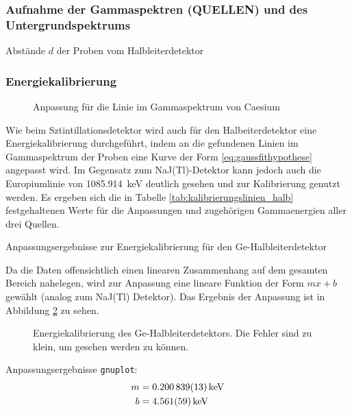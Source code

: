 \documentclass[11pt, a4paper]{article}
\numberwithin{equation}{section}
\begin{document}
\subsubsection{Aufnahme der Gammaspektren (QUELLEN) und des Untergrundspektrums}
\begin{table}[h]
	\centering
	
	\caption{Abstände $d$ der Proben vom Halbleiterdetektor}
	\label{tab:abstand_halbleiterdetektor}
\end{table}

\subsubsection{Energiekalibrierung}
\label{sec:kalibrierung_halb}
\begin{figure}[ht]
	\centering
	\resizebox{0.85\textwidth}{!}{
		
	}
	\caption{Anpassung für die Linie im Gammaspektrum von Caesium}
	\label{fig:fit_caesium}
\end{figure}

Wie beim Sztintillationsdetektor wird auch für den Halbeiterdetektor eine Energiekalibrierung durchgeführt, indem an die gefundenen Linien im Gammaspektrum der Proben eine Kurve der Form \eqref{eq:gaussfithypothese} angepasst wird.
Im Gegensatz zum NaJ(Tl)-Detektor kann jedoch auch die Europiumlinie von \SI{1085.914}{\kilo\electronvolt} deutlich gesehen und zur Kalibrierung genutzt werden.
Es ergeben sich die in Tabelle \ref{tab:kalibrierungslinien_halb} festgehaltenen Werte für die Anpassungen und zugehörigen Gammaenergien aller drei Quellen.
\begin{table}[ht]
	\centering
	
	\caption{Anpassungsergebnisse zur Energiekalibrierung für den Ge-Halbleiterdetektor}
	\label{tab:kalibrierungslinien_halb}
\end{table}
Da die Daten offensichtlich einen linearen Zusammenhang auf dem gesamten Bereich nahelegen, wird zur Anpassung eine lineare Funktion der Form $mx + b$ gewählt (analog zum NaJ(Tl) Detektor).
Das Ergebnis der Anpassung ist in Abbildung \ref{fig:kalibrierung_halb} zu sehen.
\begin{figure}[ht]
	\centering
	
	\caption{Energiekalibrierung des Ge-Halbleiterdetektors. Die Fehler sind zu klein, um gesehen werden zu können.}
	\label{fig:kalibrierung_halb}
\end{figure}  
Anpassungsergebnisse \texttt{gnuplot}:
\begin{align}
	m &= \SI{0.200839 +- 0.000013}{\kilo\electronvolt} \\
	b &= \SI{4.561 +- 0.059}{\kilo\electronvolt}
\end{align}
\end{document}
